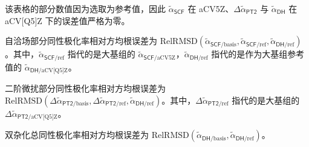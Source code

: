 \begin{table}[ht]
    \raggedright
    \par{} 该表格的部分数值因为选取为参考值，因此 $\tilde \alpha_\textsf{SCF}$ 在 aCV5Z、$\Delta \tilde \alpha_\textsf{PT2}$ 与 $\tilde \alpha_\textsf{DH}$ 在 aCV[Q5]Z 下的误差值严格为零。
    \par{} 自洽场部分同性极化率相对方均根误差为 $\text{RelRMSD} (\tilde \alpha_{\textsf{SCF}/\text{basis}}, \tilde \alpha_{\textsf{SCF}/\text{ref}}, \tilde \alpha_{\textsf{DH}/\text{ref}})$。其中，$\tilde \alpha_{\textsf{SCF}/\text{ref}}$ 指代的是大基组的 $\tilde \alpha_{\textsf{SCF}/\text{aCV5Z}}$，$\tilde \alpha_{\textsf{DH}/\text{ref}}$ 指代的是作为大基组参考值的 $\tilde \alpha_{\textsf{DH}/\text{aCV[Q5]Z}}$。
    \par{} 二阶微扰部分同性极化率相对方均根误差为 $\text{RelRMSD} (\Delta \tilde \alpha_{\textsf{PT2}/\text{basis}}, \Delta \tilde \alpha_{\textsf{PT2}/\text{ref}}, \tilde \alpha_{\textsf{DH}/\text{ref}})$。其中，$\Delta \tilde \alpha_{\textsf{PT2}/\text{ref}}$ 指代的是大基组的 $\Delta \tilde \alpha_{\textsf{PT2}/\text{aCV[Q5]Z}}$。
    \par{} 双杂化总同性极化率相对方均根误差为 $\text{RelRMSD} (\tilde \alpha_{\textsf{DH}/\text{basis}}, \tilde \alpha_{\textsf{DH}/\text{ref}})$。
\end{table}

